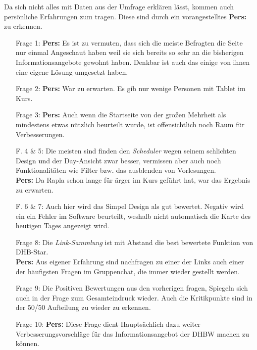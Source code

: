 Da sich nicht alles mit Daten aus der Umfrage erklären lässt, kommen auch persönliche Erfahrungen zum tragen. Diese sind durch ein vorangestelltes \textbf{Pers:} zu erkennen. 

\begin{itemize}
	\item[Frage 1:]
		{\textbf{Pers:} Es ist zu vermuten, dass sich die meiste Befragten die Seite nur einmal Angeschaut haben weil sie sich bereits so sehr an die bisherigen Informationsangebote gewohnt haben. Denkbar ist auch das einige von ihnen eine eigene Lösung umgesetzt haben.}
	\item[Frage 2:]
		{\textbf{Pers:} War zu erwarten. Es gib nur wenige Personen mit Tablet im Kurs.}
	\item[Frage 3:]
		{\textbf{Pers:} Auch wenn die Startseite von der großen Mehrheit als mindestens etwas nützlich beurteilt wurde, ist offensichtlich noch Raum für Verbesserungen.}
	\item[F. 4 \& 5:]
		{Die meisten sind finden den \emph{Scheduler} wegen seinem schlichten Design und der Day-Ansicht zwar besser, vermissen aber auch noch Funktionalitäten wie Filter bzw. das ausblenden von Vorlesungen.\\
		\textbf{Pers:} Da Rapla schon lange für ärger im Kurs geführt hat, war das Ergebnis zu erwarten.}
	\item[F. 6 \& 7:]
		{Auch hier wird das Simpel Design als gut bewertet. Negativ wird ein ein Fehler im Software beurteilt, weshalb nicht automatisch die Karte des heutigen Tages angezeigt wird. }
	\item [Frage 8:]
		{Die \emph{Link-Sammlung} ist mit Abstand die best bewertete Funktion von DHB-Star.\\
		\textbf{Pers:} Aus eigener Erfahrung sind nachfragen zu einer der Links auch einer der häufigsten Fragen im Gruppenchat, die immer wieder gestellt werden.}
	\item [Frage 9:]
		{Die Positiven Bewertungen aus den vorherigen fragen, Spiegeln sich auch in der Frage zum Gesamteindruck wieder. Auch die Kritikpunkte sind in der 50/50 Aufteilung zu wieder zu erkennen.}
	\item [Frage 10:]
		{\textbf{Pers:} Diese Frage dient Hauptsächlich dazu weiter Verbesserungsvorschläge für das Informationsangebot der DHBW machen zu können.}
\end{itemize}


